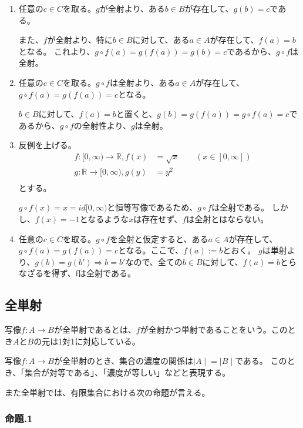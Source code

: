\documentclass[dvipdfmx,autodetect-engine]{jsarticle}
\begin{document}
\begin{enumerate}
	\item 任意の$c \in C$を取る。$g$が全射より、ある$b \in B$が存在して、$g(b) = c$である。
	
	また、$f$が全射より、特に$b \in B$に対して、ある$a \in A$が存在して、$f(a) = b$となる。
	これより、$g \circ f(a) = g(f(a)) = g(b) = c$であるから、$g \circ f$は全射。
	
	\item 任意の$c \in C$を取る。$g \circ f$は全射より、ある$a \in A$が存在して、$g \circ f(a) = g(f(a)) = c$となる。
	
	$b \in B$に対して、$f(a) = b$と置くと、$g(b) = g(f(a)) = g \circ f(a) = c$であるから、$g \circ f$の全射性より、$g$は全射。
	
    \item 反例を上げる。
    \begin{eqnarray*}
    &f:[0,∞) \to \mathbb{R}, f(x) &= \sqrt{x} \quad \quad (x \in [0,∞]) \\
    &g:\mathbb{R} \to [0, ∞), g(y) &= y^2 \\
    \end{eqnarray*}
    とする。
    
    $g \circ f(x) = x = id[0,∞)$と恒等写像であるため、$g \circ f$は全射である。
    しかし、$f(x) = −1$となるような$x$は存在せず、$f$は全射とはならない。
	
	\item 任意の$c \in C$を取る。$g \circ f$を全射と仮定すると、ある$a \in A$が存在して、$g \circ f(a) = g(f(a)) = c$となる。ここで、$f(a) := b$とおく。
	$g$は単射より、$g(b) = g(b') \Rightarrow b = b'$なので、全ての$b \in B$に対して、$f(a) = b$とらなざるを得ず、fは全射である。
\end{enumerate}


\subsection{全単射}

写像$f: A \to B$が全単射であるとは、$f$が全射かつ単射であることをいう。このとき$A$と$B$の元は1対1に対応している。

写像$f: A \to B$が全単射のとき、集合の濃度の関係は${\mid A \mid} = {\mid B \mid}$である。
このとき、「集合が対等である」、「濃度が等しい」などと表現する。

また全単射では、有限集合における次の命題が言える。

\subsubsection{ 命題.1 }
\end{document}
